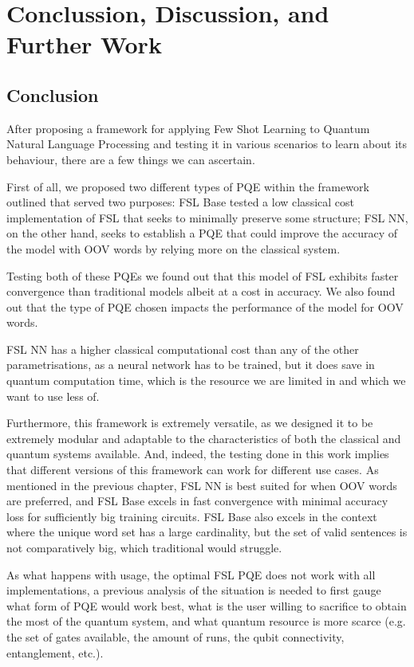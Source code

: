 \chapter{Conclussion, Discussion, and Further Work}\label{chap:conclusion}
\section{Conclusion}
After proposing a framework for applying Few Shot Learning to Quantum Natural Language Processing and testing it in various scenarios to learn about its behaviour, there are a few things we can ascertain.

First of all, we proposed two different types of PQE within the framework outlined that served two purposes: FSL Base tested a low classical cost implementation of FSL that seeks to minimally preserve some structure; FSL NN, on the other hand, seeks to establish a PQE that could improve the accuracy of the model with OOV words by relying more on the classical system.

Testing both of these PQEs we found out that this model of FSL exhibits faster convergence than traditional models albeit at a cost in accuracy. We also found out that the type of PQE chosen impacts the performance of the model for OOV words.

FSL NN has a higher classical computational cost than any of the other parametrisations, as a neural network has to be trained, but it does save in quantum computation time, which is the resource we are limited in and which we want to use less of.

Furthermore, this framework is extremely versatile, as we designed it to be extremely modular and adaptable to the characteristics of both the classical and quantum systems available. And, indeed, the testing done in this work implies that different versions of this framework can work for different use cases. As mentioned in the previous chapter, FSL NN is best suited for when OOV words are preferred, and FSL Base excels in fast convergence with minimal accuracy loss for sufficiently big training circuits. FSL Base also excels in the context where the unique word set has a large cardinality, but the set of valid sentences is not comparatively big, which traditional \mya would struggle.

As what happens with \mya usage, the optimal FSL PQE does not work with all implementations, a previous analysis of the situation is needed to first gauge what form of PQE would work best, what is the user willing to sacrifice to obtain the most of the quantum system, and what quantum resource is more scarce (e.g. the set of gates available, the amount of runs, the qubit connectivity, entanglement, etc.).

